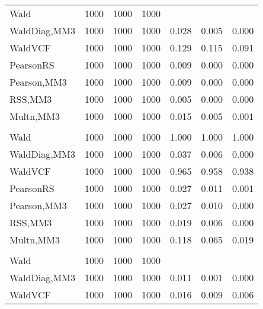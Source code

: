 \documentclass[
]{article}
\begin{document}
\begin{table}[H]
{\begin{tabular}[t]{lrrrrrr}
\hspace{1em}Wald & 1000 & 1000 & 1000 &  &  \vphantom{1} & \\
\hspace{1em}WaldDiag,MM3 & 1000 & 1000 & 1000 & 0.028 & 0.005 & 0.000\\
\hspace{1em}WaldVCF & 1000 & 1000 & 1000 & 0.129 & 0.115 & 0.091\\
\hspace{1em}PearsonRS & 1000 & 1000 & 1000 & 0.009 & 0.000 & 0.000\\
\hspace{1em}Pearson,MM3 & 1000 & 1000 & 1000 & 0.009 & 0.000 & 0.000\\
\hspace{1em}RSS,MM3 & 1000 & 1000 & 1000 & 0.005 & 0.000 & 0.000\\
\hspace{1em}Multn,MM3 & 1000 & 1000 & 1000 & 0.015 & 0.005 & 0.001\\
\addlinespace[0.3em]
\multicolumn{7}{l}{\textbf{2F 10V}}\\
\hspace{1em}Wald & 1000 & 1000 & 1000 & 1.000 & 1.000 & 1.000\\
\hspace{1em}WaldDiag,MM3 & 1000 & 1000 & 1000 & 0.037 & 0.006 & 0.000\\
\hspace{1em}WaldVCF & 1000 & 1000 & 1000 & 0.965 & 0.958 & 0.938\\
\hspace{1em}PearsonRS & 1000 & 1000 & 1000 & 0.027 & 0.011 & 0.001\\
\hspace{1em}Pearson,MM3 & 1000 & 1000 & 1000 & 0.027 & 0.010 & 0.000\\
\hspace{1em}RSS,MM3 & 1000 & 1000 & 1000 & 0.019 & 0.006 & 0.000\\
\hspace{1em}Multn,MM3 & 1000 & 1000 & 1000 & 0.118 & 0.065 & 0.019\\
\addlinespace[0.3em]
\multicolumn{7}{l}{\textbf{3F 15V}}\\
\hspace{1em}Wald & 1000 & 1000 & 1000 &  &  & \\
\hspace{1em}WaldDiag,MM3 & 1000 & 1000 & 1000 & 0.011 & 0.001 & 0.000\\
\hspace{1em}WaldVCF & 1000 & 1000 & 1000 & 0.016 & 0.009 & 0.006\\

\end{tabular}}
\end{table}
\end{document}
